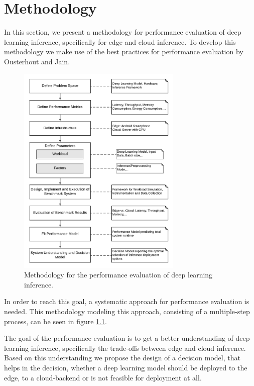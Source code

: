 \chapter{Methodology}
\label{chap:methodology}

In this section, we present a methodology for performance evaluation of deep learning inference, specifically for edge and cloud inference.
To develop this methodology we make use of the best practices for performance evaluation by Ousterhout \cite{Ousterhout:2018:AMO:3234519.3213770} and Jain\cite{books/daglib/0076234}.


\begin{figure}[!htb]
\centering
\includegraphics[width=0.7\textwidth]{./Bilder/Methodology.pdf}
\caption{Methodology for the performance evaluation of deep learning inference.}
\label{fig:Methodology}
\end{figure}
In order to reach this goal, a systematic approach for performance evaluation is needed.
This methodology modeling this approach, consisting of a multiple-step process, can be seen in figure \ref{fig:Methodology}. 


The goal of the performance evaluation is to get a better understanding of deep learning inference, specifically the trade-offs between edge and cloud inference.
Based on this understanding we propose the design of a decision model, that helps in the decision, whether a deep learning model should be deployed to the edge, to a cloud-backend or is not feasible for deployment at all.


